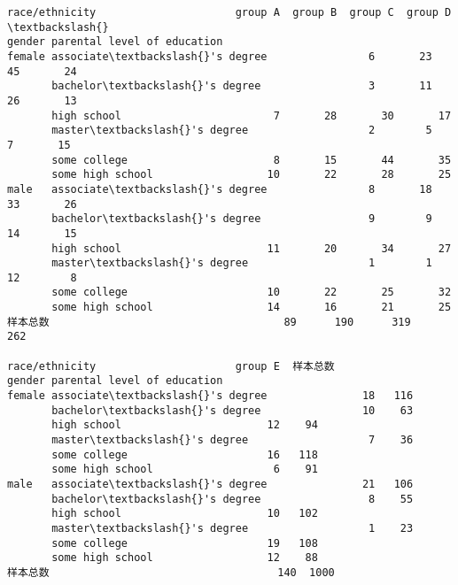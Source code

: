             \begin{tcolorbox}[breakable, size=fbox, boxrule=.5pt, pad at break*=1mm, opacityfill=0]
\begin{Verbatim}[commandchars=\\\{\}]
race/ethnicity                      group A  group B  group C  group D  \textbackslash{}
gender parental level of education
female associate\textbackslash{}'s degree                6       23       45       24
       bachelor\textbackslash{}'s degree                 3       11       26       13
       high school                        7       28       30       17
       master\textbackslash{}'s degree                   2        5        7       15
       some college                       8       15       44       35
       some high school                  10       22       28       25
male   associate\textbackslash{}'s degree                8       18       33       26
       bachelor\textbackslash{}'s degree                 9        9       14       15
       high school                       11       20       34       27
       master\textbackslash{}'s degree                   1        1       12        8
       some college                      10       22       25       32
       some high school                  14       16       21       25
样本总数                                     89      190      319      262

race/ethnicity                      group E  样本总数
gender parental level of education
female associate\textbackslash{}'s degree               18   116
       bachelor\textbackslash{}'s degree                10    63
       high school                       12    94
       master\textbackslash{}'s degree                   7    36
       some college                      16   118
       some high school                   6    91
male   associate\textbackslash{}'s degree               21   106
       bachelor\textbackslash{}'s degree                 8    55
       high school                       10   102
       master\textbackslash{}'s degree                   1    23
       some college                      19   108
       some high school                  12    88
样本总数                                    140  1000
\end{Verbatim}
\end{tcolorbox}
